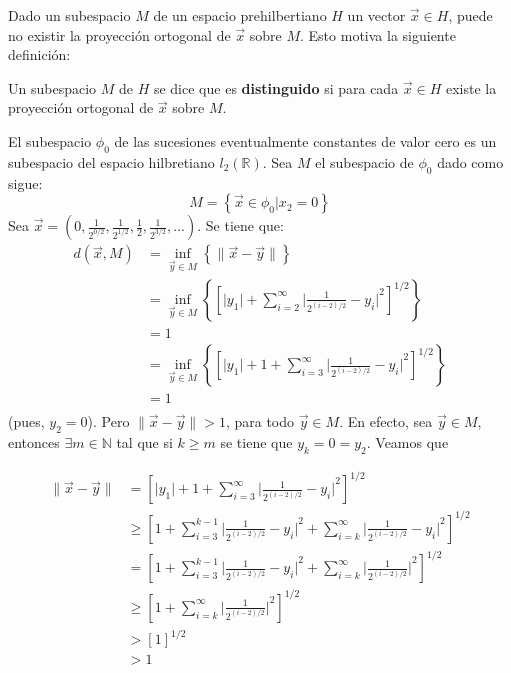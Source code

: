 \documentclass[12pt]{report}
\theoremstyle{largebreak}
\newcommand\abs[1]{\ensuremath{\big|#1\big|}}
\newcommand\norm[1]{\ensuremath{\|#1\|}}
\begin{document}
    Dado un subespacio $M$ de un espacio prehilbertiano $H$ un vector $\vec{x}\in H$, puede no existir la proyección ortogonal de $\vec{x}$ sobre $M$. Esto motiva la siguiente definición:

    \begin{mydef}
        Un subespacio $M$ de $H$ se dice que es \textbf{distinguido} si para cada $\vec{x}\in H$ existe la proyección ortogonal de $\vec{x}$ sobre $M$.        
    \end{mydef}

    \begin{exa}
        El subespacio $\phi_0$ de las sucesiones eventualmente constantes de valor cero es un subespacio del espacio hilbretiano $l_2(\mathbb{R})$. Sea $M$ el subespacio de $\phi_0$ dado como sigue:
        \begin{equation*}
            M=\left\{\vec{x}\in\phi_0|x_2=0 \right\}
        \end{equation*}
        Sea $\vec{x}=\left(0,\frac{1}{2^{0/2}},\frac{1}{2^{1/2}},\frac{1}{2},\frac{1}{2^{3/2}},... \right)$. Se tiene que:
        \begin{equation*}
            \begin{split}
                d(\vec{x},M)&=\inf_{\vec{y}\in M}\left\{\norm{\vec{x}-\vec{y}} \right\}\\
                &=\inf_{\vec{y}\in M}\left\{\left[\abs{y_1}+\sum_{i=2}^{\infty} \abs{\frac{1}{2^{(i-2)/2}}-y_i}^2 \right]^{1/2} \right\}\\
                &=1\\
                &=\inf_{\vec{y}\in M}\left\{\left[\abs{y_1}+1+\sum_{i=3}^{\infty} \abs{\frac{1}{2^{(i-2)/2}}-y_i}^2 \right]^{1/2} \right\}\\
                &=1\\
            \end{split}
        \end{equation*}
        (pues, $y_2=0$). Pero $\norm{\vec{x}-\vec{y}}>1$, para todo $\vec{y}\in M$. En efecto, sea $\vec{y}\in M$, entonces $\exists m\in\mathbb{N}$ tal que si $k\geq m$ se tiene que $y_k=0=y_2$. Veamos que

        \begin{equation*}
            \begin{split}
                \norm{\vec{x}-\vec{y}}&=\left[\abs{y_1}+1+\sum_{i=3}^{\infty} \abs{\frac{1}{2^{(i-2)/2}}-y_i}^2 \right]^{1/2}\\
                &\geq \left[1+\sum_{i=3}^{k-1} \abs{\frac{1}{2^{(i-2)/2}}-y_i}^2 + \sum_{i=k}^{\infty} \abs{\frac{1}{2^{(i-2)/2}}-y_i}^2 \right]^{1/2}\\
                &= \left[1+\sum_{i=3}^{k-1} \abs{\frac{1}{2^{(i-2)/2}}-y_i}^2 + \sum_{i=k}^{\infty} \abs{\frac{1}{2^{(i-2)/2}}}^2 \right]^{1/2}\\
                &\geq \left[1+\sum_{i=k}^{\infty} \abs{\frac{1}{2^{(i-2)/2}}}^2 \right]^{1/2}\\
                &> \left[1\right]^{1/2}\\
                &> 1\\
            \end{split}
        \end{equation*}
        

\end{exa}
\end{document}
